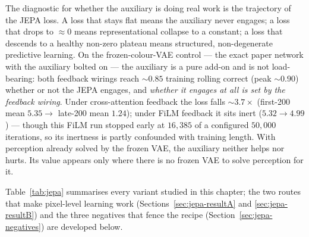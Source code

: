 The diagnostic for whether the auxiliary is doing real work is the trajectory of the JEPA
loss. A loss that stays flat means the auxiliary never engages; a loss that drops to
$\approx0$ means representational collapse to a constant; a loss that descends to a healthy
non-zero plateau means structured, non-degenerate predictive learning. On the
frozen-colour-VAE control --- the exact paper network with the auxiliary bolted on --- the
auxiliary is a pure add-on and is not load-bearing: both feedback wirings reach $\sim0.85$
training rolling correct (peak $\sim0.90$) whether or not the JEPA engages, and \emph{whether
it engages at all is set by the feedback wiring}. Under cross-attention feedback the loss
falls $\sim3.7\times$ (first-200 mean $5.35\to$ late-200 mean $1.24$); under FiLM feedback it
sits inert ($5.32\to4.99$) --- though this FiLM run stopped early at $16{,}385$ of a
configured $50{,}000$ iterations, so its inertness is partly confounded with training length.
With perception already solved by the frozen VAE, the auxiliary neither helps nor hurts. Its
value appears only where there is no frozen VAE to solve perception for it.

Table~\ref{tab:jepa} summarises every variant studied in this chapter; the two routes that
make pixel-level learning work (Sections~\ref{sec:jepa-resultA} and \ref{sec:jepa-resultB})
and the three negatives that fence the recipe (Section~\ref{sec:jepa-negatives}) are
developed below.

